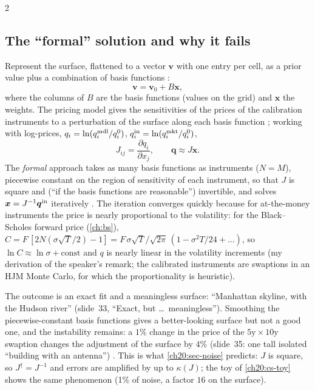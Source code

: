 \begin{paracol}{2}
\subsection{The ``formal'' solution and why it fails}\label{ch20:sec-volformal}
Represent the surface, flattened to a vector $\bm v$ with one entry per cell, as a prior value plus a combination of basis functions :
\begin{equation}\label{ch20:eq-vbasis}
  \bm v=\bm v_0+B\bm x,
\end{equation}
where the columns of $B$ are the basis functions (values on the grid) and $\bm x$ the weights. The pricing model gives the sensitivities of the prices of the calibration instruments to a perturbation of the surface along each basis function ; working with
log-prices, $q_i=\ln(q_i^{\rm mdl}/q_i^{0})$, $q_i^{\rm in}=\ln(q_i^{\rm mkt}/q_i^{0})$,
\begin{equation}\label{ch20:eq-jac}
  J_{ij}=\frac{\partial q_i}{\partial x_j},\qquad \bm q\approx J\bm x .
\end{equation}
The \emph{formal} approach takes as many basis functions as instruments ($N=M$), piecewise constant on the region of sensitivity of each instrument, so that $J$ is square and (``if the basis functions are reasonable'') invertible, and solves $\bm x=J^{-1}\bm q^{\rm in}$ iteratively .
The iteration converges quickly because for at-the-money instruments the price is nearly proportional to the volatility: for the Black--Scholes forward price (\cref{ch:bs}), $C=F\,[2N(\sigma\sqrt T/2)-1]=F\,\sigma\sqrt{T}/\sqrt{2\pi}\,(1-\sigma^2T/24+\dots)$, so $\ln C\approx\ln\sigma+\text{const}$ and $q$ is nearly linear in the volatility
increments (my derivation of the speaker's remark; the calibrated instruments are swaptions in an HJM Monte Carlo, for which the proportionality is heuristic).

The outcome is an exact fit and a meaningless surface: ``Manhattan skyline, with the Hudson river''  (slide~33, ``Exact, but \dots\ meaningless''). Smoothing the piecewise-constant basis functions gives a better-looking surface but not a good one, and the instability
remains: a $1\%$ change in the price of the $5\text{y}\times10\text{y}$ swaption changes the adjustment of the surface by $4\%$ (slide~35: one tall isolated ``building with an antenna'') . This is what \cref{ch20:sec-noise} predicts: $J$ is square, so
$J^\dagger=J^{-1}$ and errors are amplified by up to $\kappa(J)$; the toy of \cref{ch20:cs-toy} shows the same phenomenon (1\% of noise, a factor $16$ on the surface).


\end{paracol}
